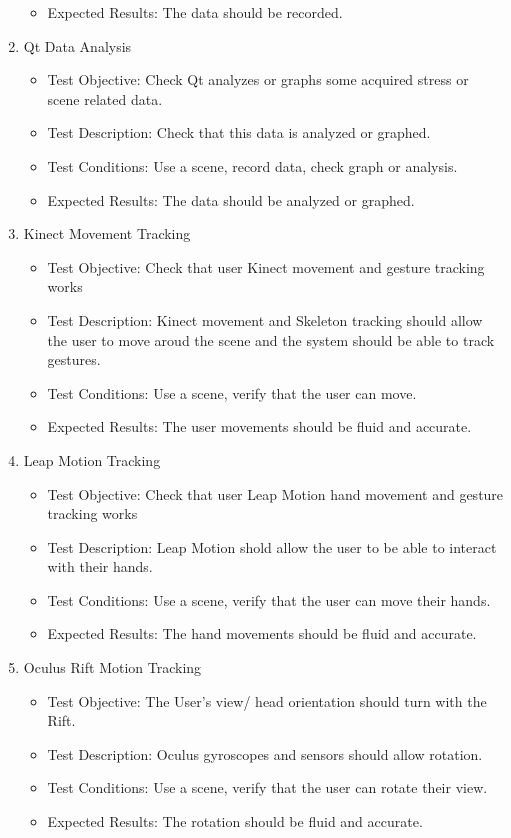 \documentclass[a4paper,10pt]{article}
\begin{document}
\begin{enumerate}
\begin{itemize}
	\item Expected Results: The data should  be recorded.
    \end{itemize}
    \item  Qt Data Analysis
     \begin{itemize}
	\item Test Objective: Check Qt analyzes or graphs some acquired stress or scene related data.
	\item Test Description: Check that this data is analyzed or graphed.
	\item Test Conditions: Use a scene, record data, check graph or analysis.
	\item Expected Results: The data should  be analyzed or graphed.
    \end{itemize}
     \item Kinect Movement Tracking
     \begin{itemize}
	\item Test Objective: Check that user Kinect movement and gesture tracking works
	\item Test Description: Kinect movement and Skeleton tracking should allow the user to move aroud the scene and the system should be able to track gestures.
	\item Test Conditions: Use a scene, verify that the user can move.
	\item Expected Results: The user movements should be fluid and accurate.
    \end{itemize}
     \item Leap Motion Tracking
     \begin{itemize}
	\item Test Objective: Check that user Leap Motion hand movement and gesture tracking works
	\item Test Description: Leap Motion shold allow the user to be able to interact with their hands.
	\item Test Conditions: Use a scene, verify that the user can move their hands.
	\item Expected Results: The hand movements should be fluid and accurate.
    \end{itemize}
     \item Oculus Rift Motion Tracking
     \begin{itemize}
	\item Test Objective: The User's view/ head orientation should turn with the Rift.
	\item Test Description: Oculus gyroscopes and sensors should allow rotation.
	\item Test Conditions: Use a scene, verify that the user can rotate their view.
	\item Expected Results: The rotation should be fluid and accurate.
    \end{itemize}
     
\end{enumerate}
\end{document}
